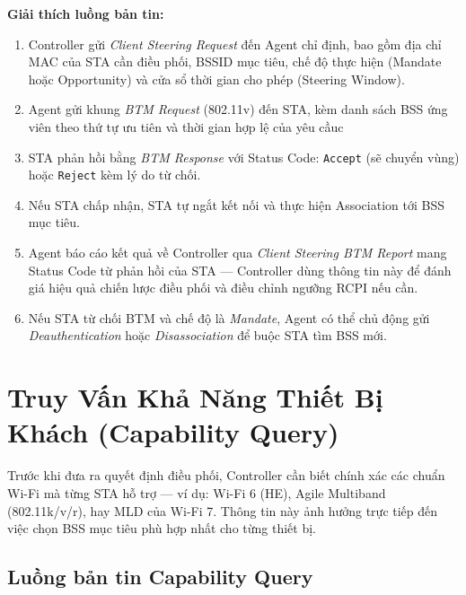 \textbf{Giải thích luồng bản tin:}
\begin{enumerate}
	\item Controller gửi \textit{Client Steering Request} đến Agent chỉ định, bao gồm
	địa chỉ MAC của STA cần điều phối, BSSID mục tiêu, chế độ thực hiện
	(Mandate hoặc Opportunity) và cửa sổ thời gian cho phép (Steering Window).
	\item Agent gửi khung \textit{BTM Request} (802.11v) đến STA, kèm danh sách BSS
	ứng viên theo thứ tự ưu tiên và thời gian hợp lệ của yêu cầuc
	\item STA phản hồi bằng \textit{BTM Response} với Status Code: \texttt{Accept}
	(sẽ chuyển vùng) hoặc \texttt{Reject} kèm lý do từ chối.
	\item Nếu STA chấp nhận, STA tự ngắt kết nối và thực hiện Association tới BSS
	mục tiêu.
	\item Agent báo cáo kết quả về Controller qua \textit{Client Steering BTM Report}
	mang Status Code từ phản hồi của STA --- Controller dùng thông tin này để
	đánh giá hiệu quả chiến lược điều phối và điều chỉnh ngưỡng RCPI nếu cần.
	\item[\textbf{6*.}] Nếu STA từ chối BTM và chế độ là \textit{Mandate}, Agent có
	thể chủ động gửi \textit{Deauthentication} hoặc \textit{Disassociation} để
	buộc STA tìm BSS mới.
\end{enumerate}


\section{Truy Vấn Khả Năng Thiết Bị Khách (Capability Query)}

Trước khi đưa ra quyết định điều phối, Controller cần biết chính xác các chuẩn Wi-Fi
mà từng STA hỗ trợ --- ví dụ: Wi-Fi 6 (HE), Agile Multiband (802.11k/v/r), hay MLD
của Wi-Fi 7. Thông tin này ảnh hưởng trực tiếp đến việc chọn BSS mục tiêu phù hợp
nhất cho từng thiết bị.


\subsection{Luồng bản tin Capability Query}

